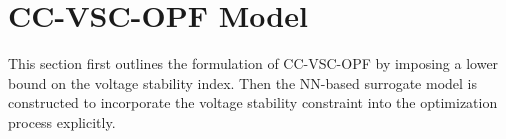 \documentclass[journal]{IEEEtran}
\theoremstyle{definition}
\theoremstyle{remark}
\begin{document}
%


\section{CC-VSC-OPF Model}\label{prelimibary}
This section first outlines the formulation of CC-VSC-OPF by imposing a lower bound on the voltage stability index. Then the NN-based surrogate model is constructed to incorporate the voltage stability constraint into the optimization process explicitly.  
\end{document}
